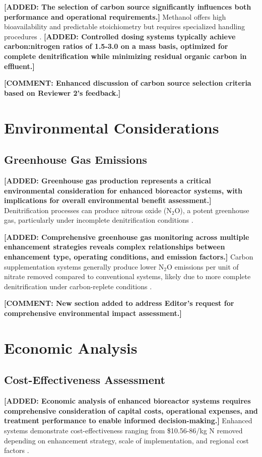\documentclass[12pt,a4paper]{article}
\newcommand{\added}[1]{\textcolor{addedtext}{\textbf{[ADDED: #1]}}}
\newcommand{\comment}[1]{\textcolor{commenttext}{\textbf{[COMMENT: #1]}}}
\begin{document}
\added{The selection of carbon source significantly influences both performance and operational requirements.} Methanol offers high bioavailability and predictable stoichiometry but requires specialized handling procedures \citep{RN632}. \added{Controlled dosing systems typically achieve carbon:nitrogen ratios of 1.5-3.0 on a mass basis, optimized for complete denitrification while minimizing residual organic carbon in effluent.}

\comment{Enhanced discussion of carbon source selection criteria based on Reviewer 2's feedback.}

\section{Environmental Considerations}

\subsection{Greenhouse Gas Emissions}

\added{Greenhouse gas production represents a critical environmental consideration for enhanced bioreactor systems, with implications for overall environmental benefit assessment.} Denitrification processes can produce nitrous oxide (N$_2$O), a potent greenhouse gas, particularly under incomplete denitrification conditions \citep{RN611, RN708}.

\added{Comprehensive greenhouse gas monitoring across multiple enhancement strategies reveals complex relationships between enhancement type, operating conditions, and emission factors.} Carbon supplementation systems generally produce lower N$_2$O emissions per unit of nitrate removed compared to conventional systems, likely due to more complete denitrification under carbon-replete conditions \citep{RN708}.

\comment{New section added to address Editor's request for comprehensive environmental impact assessment.}

\section{Economic Analysis}

\subsection{Cost-Effectiveness Assessment}

\added{Economic analysis of enhanced bioreactor systems requires comprehensive consideration of capital costs, operational expenses, and treatment performance to enable informed decision-making.} Enhanced systems demonstrate cost-effectiveness ranging from \$10.56-86/kg N removed depending on enhancement strategy, scale of implementation, and regional cost factors \citep{RN632, RN350, RN624}.
\end{document}
